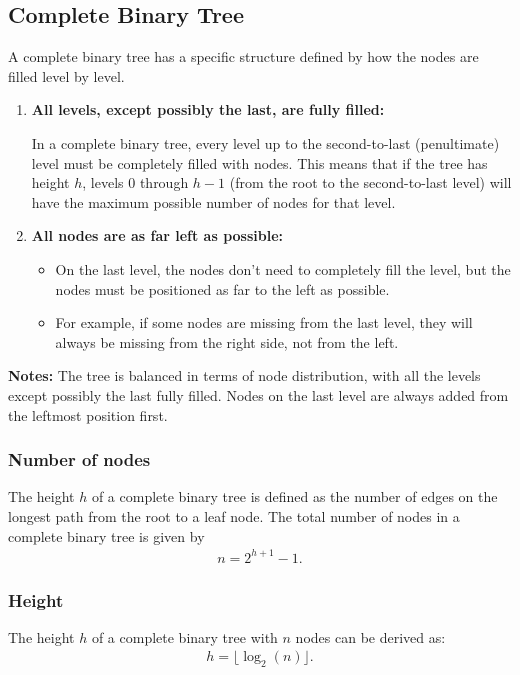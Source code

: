 \documentclass{report}
\begin{document}
\subsection{Complete Binary Tree}
\bigbreak \noindent 
A complete binary tree has a specific structure defined by how the nodes are filled level by level.
\begin{enumerate}
    \item \textbf{All levels, except possibly the last, are fully filled:}
        \begin{itemize}
            In a complete binary tree, every level up to the second-to-last (penultimate) level must be completely filled with nodes.
            This means that if the tree has height $h$, levels $0$ through $h - 1$ (from the root to the second-to-last level) will have the maximum possible number of nodes for that level.
        \end{itemize}
        \item \textbf{All nodes are as far left as possible:}
            \begin{itemize}
                \item On the last level, the nodes don't need to completely fill the level, but the nodes must be positioned as far to the left as possible.
                \item For example, if some nodes are missing from the last level, they will always be missing from the right side, not from the left.
            \end{itemize}
\end{enumerate}
\bigbreak \noindent 
\textbf{Notes:} The tree is balanced in terms of node distribution, with all the levels except possibly the last fully filled.
\bigbreak \noindent 
Nodes on the last level are always added from the leftmost position first.

\bigbreak \noindent 
\subsubsection{Number of nodes}
\bigbreak \noindent 
The height $h$ of a complete binary tree is defined as the number of edges on the longest path from the root to a leaf node.
\bigbreak \noindent 
The total number of nodes in a complete binary tree is given by
\begin{align*}
    n = 2^{h+1} - 1
.\end{align*}
\bigbreak \noindent 
\subsubsection{Height}
\bigbreak \noindent 
The height $h$ of a complete binary tree with $n$ nodes can be derived as:
\begin{align*}
   h = \lfloor \log_{2}(n) \rfloor
.\end{align*}
\end{document}
